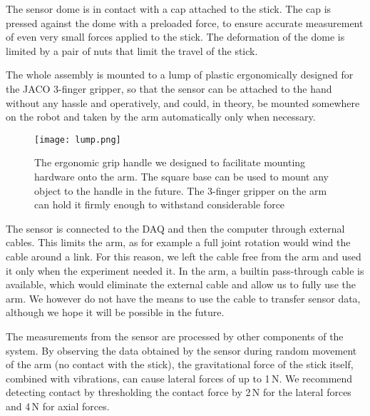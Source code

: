 \documentclass[buriama8_dp.tex]{subfiles}
\begin{document}
The sensor dome is in contact with a cap attached to the stick. The cap is pressed against the dome with a preloaded force, to ensure accurate measurement of even very small forces applied to the stick. The deformation of the dome is limited by a pair of nuts that limit the travel of the stick.

The whole assembly is mounted to a lump of plastic ergonomically designed for the JACO 3-finger gripper, so that the sensor can be attached to the hand without any hassle and operatively, and could, in theory, be mounted somewhere on the robot and taken by the arm automatically only when necessary.

\begin{figure}[ht]
  \centering
  \texttt{[image: lump.png]}
  \caption[Tool grip handle]{The ergonomic grip handle we designed to facilitate mounting hardware onto the arm. The square base can be used to mount any object to the handle in the future. The 3-finger gripper on the arm can hold it firmly enough to withstand considerable force}
  \label{fig:label}
\end{figure}

The sensor is connected to the DAQ and then the computer through external cables. This limits the arm, as for example a full joint rotation would wind the cable around a link. For this reason, we left the cable free from the arm and used it only when the experiment needed it. In the arm, a builtin pass-through cable is available, which would eliminate the external cable and allow us to fully use the arm. We however do not have the means to use the cable to transfer sensor data, although we hope it will be possible in the future.

The measurements from the sensor are processed by other components of the system. By observing the data obtained by the sensor during random movement of the arm (no contact with the stick), the gravitational force of the stick itself, combined with vibrations, can cause lateral forces of up to 1\,N. We recommend detecting contact by thresholding the contact force by 2\,N for the lateral forces and 4\,N for axial forces.
\end{document}
